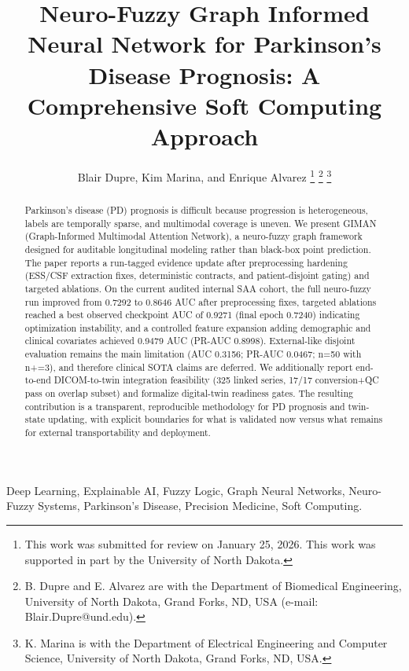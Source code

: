\documentclass[journal,twoside,web]{ieeecolor}
\begin{document}
\title{Neuro-Fuzzy Graph Informed Neural Network for Parkinson's Disease Prognosis: A Comprehensive Soft Computing Approach}

\author{Blair Dupre, Kim Marina, and Enrique Alvarez
\thanks{This work was submitted for review on January 25, 2026. This work was supported in part by the University of North Dakota.}
\thanks{B. Dupre and E. Alvarez are with the Department of Biomedical Engineering, University of North Dakota, Grand Forks, ND, USA (e-mail: Blair.Dupre@und.edu).}
\thanks{K. Marina is with the Department of Electrical Engineering and Computer Science, University of North Dakota, Grand Forks, ND, USA.}
}

\maketitle

\begin{abstract}
Parkinson's disease (PD) prognosis is difficult because progression is heterogeneous, labels are temporally sparse, and multimodal coverage is uneven. We present GIMAN (Graph-Informed Multimodal Attention Network), a neuro-fuzzy graph framework designed for auditable longitudinal modeling rather than black-box point prediction. The paper reports a run-tagged evidence update after preprocessing hardening (ESS/CSF extraction fixes, deterministic contracts, and patient-disjoint gating) and targeted ablations. On the current audited internal SAA cohort, the full neuro-fuzzy run improved from 0.7292 to 0.8646 AUC after preprocessing fixes, targeted ablations reached a best observed checkpoint AUC of 0.9271 (final epoch 0.7240) indicating optimization instability, and a controlled feature expansion adding demographic and clinical covariates achieved 0.9479 AUC (PR-AUC 0.8998). External-like disjoint evaluation remains the main limitation (AUC 0.3156; PR-AUC 0.0467; n=50 with n+=3), and therefore clinical SOTA claims are deferred. We additionally report end-to-end DICOM-to-twin integration feasibility (325 linked series, 17/17 conversion+QC pass on overlap subset) and formalize digital-twin readiness gates. The resulting contribution is a transparent, reproducible methodology for PD prognosis and twin-state updating, with explicit boundaries for what is validated now versus what remains for external transportability and deployment.
\end{abstract}

\begin{IEEEkeywords}
Deep Learning, Explainable AI, Fuzzy Logic, Graph Neural Networks, Neuro-Fuzzy Systems, Parkinson's Disease, Precision Medicine, Soft Computing.
\end{IEEEkeywords}
\end{document}
